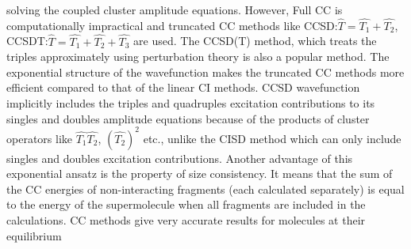 solving the coupled cluster amplitude equations. However, Full CC is
computationally impractical and truncated CC methods like CCSD:\;$\hat{T} =
\hat{T_1} + \hat{T_2}$, CCSDT:\;$\hat{T} = \hat{T_1} + \hat{T_2} + \hat{T_3}$ 
are used. The CCSD(T)\cite{Shen12} method, which treats the triples approximately using
perturbation theory is also a popular method.
The exponential structure of the wavefunction makes the truncated CC methods more efficient 
compared to that of the linear CI methods. CCSD wavefunction implicitly includes the triples
and quadruples excitation contributions to its singles and doubles amplitude equations because 
of the products of cluster operators like $\hat{T_1}\hat{T_2}$, ${(\hat{T_2})}^2$ etc., unlike 
the CISD method which can only include singles and doubles excitation contributions. 
Another advantage of this exponential ansatz is the property of size consistency\cite{Crawford00}.
It means that the sum of the CC energies of non-interacting fragments (each calculated 
separately) is equal to the energy of the supermolecule when all fragments are included 
in the calculations. CC methods give very accurate results for molecules at their equilibrium 
